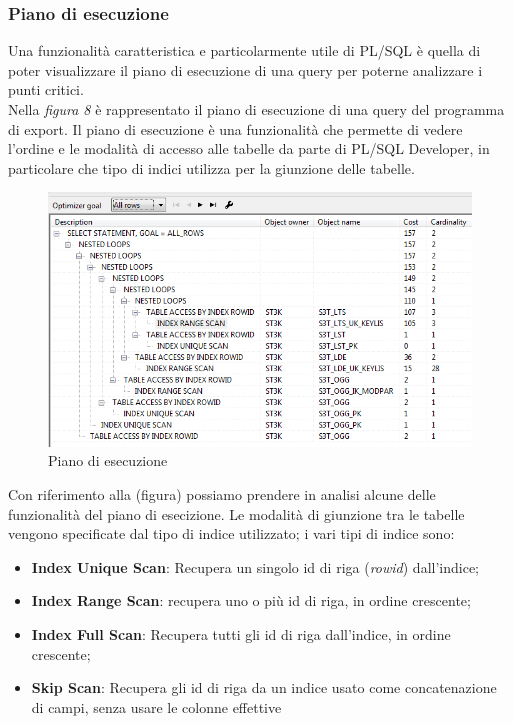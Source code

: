 \subsubsection{Piano di esecuzione}
Una funzionalità caratteristica e particolarmente utile di PL/SQL è quella di poter visualizzare il piano di esecuzione di una query per poterne analizzare i punti critici.\\
Nella \textit{figura 8} è rappresentato il piano di esecuzione di una query del programma di export. Il piano di esecuzione è una funzionalità che permette di vedere l'ordine e le modalità di accesso alle tabelle da parte di PL/SQL Developer, in particolare che tipo di indici utilizza per la giunzione delle tabelle.
\begin{figure}[!h]
\thispagestyle{empty}
\centering
\includegraphics[scale=0.83]{img/Piano.png}
\caption{Piano di esecuzione}
\end{figure}
Con riferimento alla (figura) possiamo prendere in analisi alcune delle funzionalità del piano di esecizione. Le modalità di giunzione tra le tabelle vengono specificate dal tipo di indice utilizzato; i vari tipi di indice sono:
\begin{itemize}
\item \textbf{Index Unique Scan}: Recupera un singolo id di riga (\textit{rowid}) dall'indice;
\item \textbf{Index Range Scan}: recupera uno o più id di riga, in ordine crescente;
\item \textbf{Index Full Scan}: Recupera tutti gli id di riga dall'indice, in ordine crescente;
\item \textbf{Skip Scan}: Recupera gli id di riga da un indice usato come concatenazione di campi, senza usare le colonne effettive
\end{itemize}
